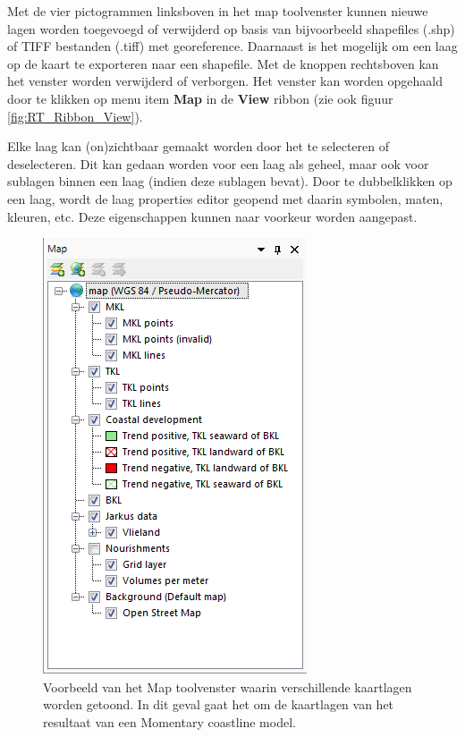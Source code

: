 Met de vier pictogrammen linksboven in het map toolvenster kunnen nieuwe lagen worden toegevoegd of verwijderd op basis van bijvoorbeeld shapefiles (.shp) of TIFF bestanden (.tiff) met georeference. Daarnaast is het mogelijk om een laag op de kaart te exporteren naar een shapefile. Met de knoppen rechtsboven kan het venster worden verwijderd of verborgen. Het venster kan worden opgehaald door te klikken op menu item \textbf{Map} in de \textbf{View} ribbon (zie ook figuur \ref{fig:RT_Ribbon_View}).

Elke laag kan (on)zichtbaar gemaakt worden door het te selecteren of deselecteren. Dit kan gedaan worden voor een laag als geheel, maar ook voor sublagen binnen een laag (indien deze sublagen bevat). Door te dubbelklikken op een laag, wordt de laag properties editor geopend met daarin symbolen, maten, kleuren, etc. Deze eigenschappen kunnen naar voorkeur worden aangepast.

\begin{figure}[h!]
	\centering
		\includegraphics{figures/chapter_general/Map_Contents.png}
		\caption{Voorbeeld van het Map toolvenster waarin verschillende kaartlagen worden getoond. In dit geval gaat het om de kaartlagen van het resultaat van een Momentary coastline model.}
	\label{fig:Map_Contents}
\end{figure}

